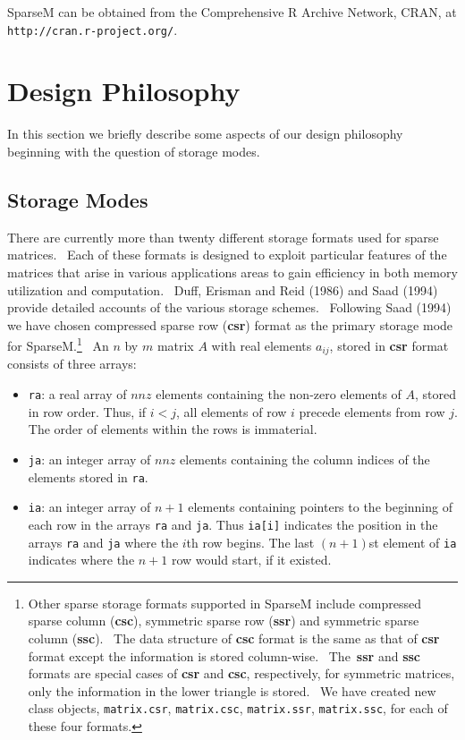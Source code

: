 \documentclass{article}
\begin{document}
SparseM can be obtained from the Comprehensive  R Archive Network, CRAN, at
\texttt{http://cran.r-project.org/}. 

\section{Design Philosophy}

In this section we briefly describe some aspects of our design philosophy 
beginning with the question of storage modes.

\subsection{Storage Modes}

There are currently more than twenty different storage formats 
used for sparse matrices. \ Each of these formats is designed to exploit
particular features of the matrices that arise in various
applications areas to gain efficiency in both memory utilization and computation.
\ Duff, Erisman and Reid (1986) and Saad (1994) provide detailed
accounts of the various storage schemes. \ Following Saad (1994) we have
chosen compressed sparse row (\textbf{csr}) format as the primary storage mode for
SparseM.\footnote{Other sparse storage formats supported in SparseM include
compressed sparse column (\textbf{csc}), symmetric sparse row (\textbf{ssr}) and
symmetric sparse column (\textbf{ssc}). \ The data structure of \textbf{csc}
format is the same as that of \textbf{csr} format except the information is
stored column-wise. \ The\ \textbf{ssr} and \textbf{ssc} formats are special cases of
\textbf{csr} and \textbf{csc}, respectively, for symmetric matrices, 
only the information in the lower triangle is stored. 
\ We have created new class objects, \texttt{matrix.csr}, \texttt{matrix.csc},
\texttt{matrix.ssr}, \texttt{matrix.ssc}, for each of these four formats.}
\ An $n$ by $m$ matrix $A$ with real elements $a_{ij}$, stored in
\textbf{csr} format consists of three arrays:

\begin{itemize}
\item \texttt{ra}: a real array of $nnz$ elements containing the non-zero
elements of $A$, stored in row order. Thus, if $i<j$, all elements of row $i$
precede elements from row $j$. The order of elements within the rows is immaterial.

\item \texttt{ja}: an integer array of $nnz$ elements containing the column
indices of the elements stored in \texttt{ra}.

\item \texttt{ia}: an integer array of $n+1$ elements containing pointers to
the beginning of each row in the arrays \texttt{ra} and \texttt{ja}. Thus
\texttt{ia[i]} indicates the position in the arrays \texttt{ra} and
\texttt{ja} where the $i$th row begins. The last $(n+1)$st element of
\texttt{ia} indicates where the $n+1$ row would start, if it existed.
\end{itemize}
\end{document}
